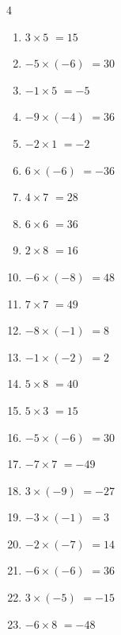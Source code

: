 \begin{multicols}{4}
\begin{enumerate}
  \item $3\times 5$
        $=15$

  \item $-5\times (-6)$
        $=30$

  \item $-1\times 5$
        $=-5$

  \item $-9\times (-4)$
        $=36$

  \item $-2\times 1$
        $=-2$

  \item $6\times (-6)$
        $=-36$

  \item $4\times 7$
        $=28$

  \item $6\times 6$
        $=36$

  \item $2\times 8$
        $=16$

  \item $-6\times (-8)$
        $=48$

  \item $7\times 7$
        $=49$

  \item $-8\times (-1)$
        $=8$

  \item $-1\times (-2)$
        $=2$

  \item $5\times 8$
        $=40$

  \item $5\times 3$
        $=15$

  \item $-5\times (-6)$
        $=30$

  \item $-7\times 7$
        $=-49$

  \item $3\times (-9)$
        $=-27$

  \item $-3\times (-1)$
        $=3$

  \item $-2\times (-7)$
        $=14$

  \item $-6\times (-6)$
        $=36$

  \item $3\times (-5)$
        $=-15$

  \item $-6\times 8$
        $=-48$


\end{enumerate}
\end{multicols}
